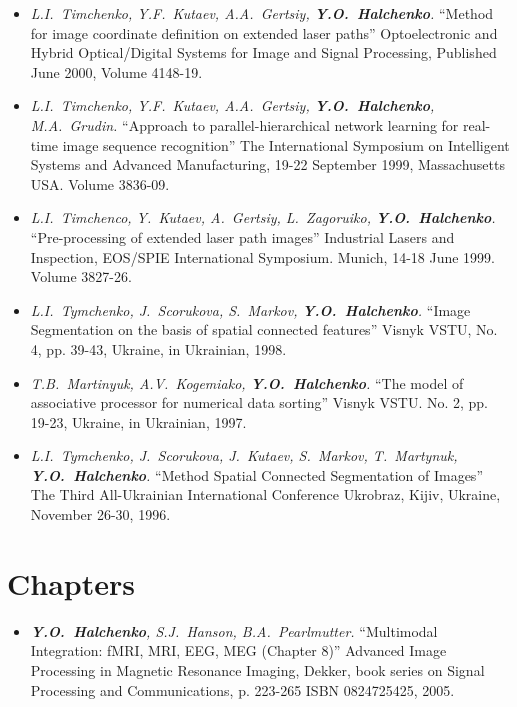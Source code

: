 \documentclass[12pt,overlapped,line]{res}
\newcommand{\mtitle}[1]{``#1''}
\newcommand{\mauthors}[1]{ \textit{#1.}}
\newcommand{\mwhere}[1]{#1.}
\begin{document}
\begin{resume}
\begin{itemize}
  \item
     \mauthors{L.I.~Timchenko, Y.F.~Kutaev, A.A.~Gertsiy, \textbf{Y.O.~Halchenko}}
     \mtitle{Method for image coordinate definition on extended laser paths}
     \mwhere{Optoelectronic and Hybrid Optical/Digital Systems for Image and Signal Processing, Published June 2000,  Volume 4148-19}

  \item
     \mauthors{L.I.~Timchenko, Y.F.~Kutaev, A.A.~Gertsiy, \textbf{Y.O.~Halchenko},
     M.A.~Grudin}
     \mtitle{Approach to parallel-hierarchical network learning for real-time image sequence recognition}
     \mwhere{The International Symposium on Intelligent Systems and Advanced Manufacturing, 19-22 September 1999, Massachusetts USA. Volume 3836-09}

   \item
     \mauthors{L.I.~Timchenco, Y.~Kutaev, A.~Gertsiy, L.~Zagoruiko, \textbf{Y.O.~Halchenko}}
     \mtitle{Pre-processing of extended laser path images}
     \mwhere{Industrial Lasers and Inspection, EOS/SPIE International Symposium. Munich, 14-18 June 1999. Volume 3827-26}

   \item
     \mauthors{L.I.~Tymchenko, J.~Scorukova, S.~Markov, \textbf{Y.O.~Halchenko}}
     \mtitle{Image Segmentation on the basis of spatial connected features}
     \mwhere{Visnyk VSTU, No. 4, pp. 39-43, Ukraine, in Ukrainian, 1998}

   \item
     \mauthors{T.B.~Martinyuk, A.V.~Kogemiako, \textbf{Y.O.~Halchenko}}
     \mtitle{The model of associative processor for numerical data sorting}
     \mwhere{ Visnyk VSTU. No. 2, pp. 19-23, Ukraine, in Ukrainian, 1997}

   \item
     \mauthors{L.I.~Tymchenko, J.~Scorukova, J.~Kutaev, S.~Markov, T.~Martynuk, \textbf{Y.O.~Halchenko}}
     \mtitle{Method Spatial Connected Segmentation of Images}
     \mwhere{The Third All-Ukrainian International Conference Ukrobraz, Kijiv, Ukraine, November 26-30, 1996}
 \end{itemize}

\section{Chapters}

\begin{itemize}
  \item
    \mauthors{\textbf{Y.O.~Halchenko}, S.J.~Hanson, B.A.~Pearlmutter}
    \mtitle{Multimodal Integration: fMRI, MRI, EEG, MEG (Chapter 8)}
    \mwhere{Advanced Image Processing in Magnetic Resonance Imaging,
      Dekker, book series on Signal Processing and Communications, p. 223-265
      ISBN 0824725425, 2005}
 \end{itemize}


\end{resume}
\end{document}
